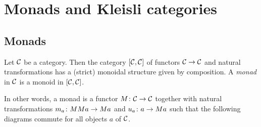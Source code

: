 \chapter{Monads and Kleisli categories}
\label{ChapMonads}

\section{Monads}

Let ${\mathcal{C}}$ be a category.  
Then the category $[{\mathcal{C}},{\mathcal{C}}]$ of functors ${\mathcal{C}}\to{\mathcal{C}}$ and natural transformations has a (strict) monoidal structure given by composition.  
A \emph{monad} \cite[\sec VI]{WorkingMathematician} in ${\mathcal{C}}$ is a monoid in $[{\mathcal{C}},{\mathcal{C}}]$.

In other words, a monad is a functor $M\colon {\mathcal{C}}\to{\mathcal{C}}$ together with natural  transformations $m_a \colon MMa \to Ma$ and $u_a \colon a \to Ma$ such that the following diagrams commute for all objects $a$ of ${\mathcal{C}}$.


